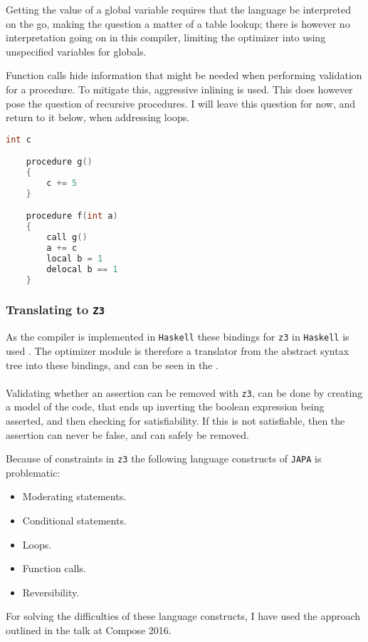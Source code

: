Getting the value of a global variable
requires that the language be interpreted on the go, making the question a matter of a table
lookup; there is however no interpretation going on in this compiler, limiting the optimizer
into using unspecified variables for globals.

Function calls hide information that might be needed when performing validation for a procedure.
To mitigate this, aggressive inlining is used. This does however pose the question of recursive
procedures. I will leave this question for now, and return to it below, when addressing loops.

\begin{lstlisting}[language=C++]
    int c

    procedure g()
    {
        c += 5
    }

    procedure f(int a)
    {
        call g()
        a += c
        local b = 1
        delocal b == 1
    }
\end{lstlisting}

\subsubsection{Translating to \texttt{Z3}} %
As the compiler is implemented in \texttt{Haskell} these bindings for \texttt{z3} in
\texttt{Haskell} is used \cite{Z3:BINDINGS}. The optimizer module is therefore a translator from
the abstract syntax tree into these bindings, and can be seen in the .
\\
\\
Validating whether an assertion can be removed with \texttt{z3}, can be done by creating a model
of the code, that ends up inverting the boolean expression being asserted, and then checking
for satisfiability. If this is not satisfiable, then the assertion can never be false, and
can safely be removed.

Because of constraints in \texttt{z3} the following language constructs of \texttt{JAPA} is
problematic:
\begin{itemize}
    \item Moderating statements.
    \item Conditional statements.
    \item Loops.
    \item Function calls.
    \item Reversibility.
\end{itemize}
\noindent
For solving the difficulties of these language constructs, I have used the approach outlined
in the talk \cite{Z3:TRANSLATION} at Compose 2016.

